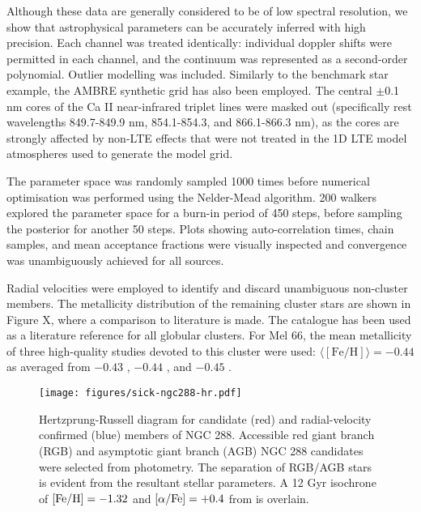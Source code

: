 \documentclass{aastex}
\begin{document}

Although these data are generally considered to be of low spectral resolution, we show that astrophysical parameters can be accurately inferred with high precision. Each channel was treated identically: individual doppler shifts were permitted in each channel, and the continuum was represented as a second-order polynomial. Outlier modelling was included. Similarly to the benchmark star example, the AMBRE synthetic grid has also been employed. The central $\pm$0.1 nm cores of the Ca II near-infrared triplet lines were masked out (specifically rest wavelengths 849.7-849.9 nm, 854.1-854.3, and 866.1-866.3 nm), as the cores are strongly affected by non-LTE effects that were not treated in the 1D LTE model atmospheres used to generate the model grid. 

The parameter space was randomly sampled 1000 times before numerical optimisation was performed using the Nelder-Mead algorithm. 200 walkers explored the parameter space for a burn-in period of 450 steps, before sampling the posterior for another 50 steps. Plots showing auto-correlation times, chain samples, and mean acceptance fractions were visually inspected and convergence was unambiguously achieved for all sources.

Radial velocities were employed to identify and discard unambiguous non-cluster members. The metallicity distribution of the remaining cluster stars are shown in Figure X, where a comparison to literature is made. The \citet{harris} catalogue has been used as a literature reference for all globular clusters. For Mel 66, the mean metallicity of three high-quality studies devoted to this cluster were used: $\langle[\mbox{Fe/H}]\rangle = -0.44$ as averaged from $-0.43$ \citep{who}, $-0.44$ \citep{who}, and $-0.45$ \citep{who}.

\begin{figure}
\texttt{[image: figures/sick-ngc288-hr.pdf]}
\caption{Hertzprung-Russell diagram for candidate (red) and radial-velocity confirmed (blue) members of NGC 288. Accessible red giant branch (RGB) and asymptotic giant branch (AGB) NGC 288 candidates were selected from \citet{who} photometry. The separation of RGB/AGB stars is evident from the resultant stellar parameters. A 12 Gyr isochrone of ${{\rm [Fe/H]} = -1.32}$ \citep{harris} and ${[\alpha/{\rm Fe}] = +0.4}$ from \citet{dotter} is overlain.}
\end{figure}

\end{document}
